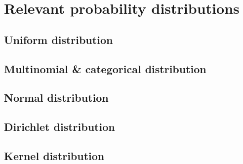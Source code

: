 \chapter{Relevant probability distributions}
\label{chap:probdistributions}

\section*{Uniform distribution}

\section*{Multinomial \& categorical distribution}

\section*{Normal distribution}

\section*{Dirichlet distribution}

\section*{Kernel distribution}

